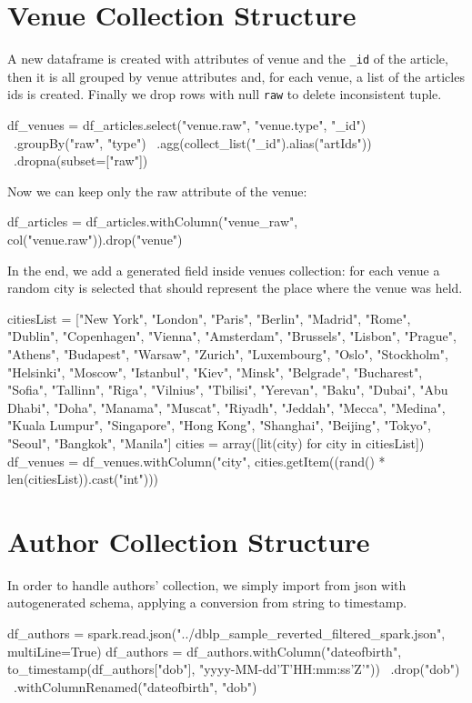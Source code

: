 \documentclass{Configuration_Files/PoliMi3i_thesis}
\begin{document}
\section{Venue Collection Structure}
A new dataframe is created with attributes of venue and the \verb |_id| of the article, then it is all grouped by
venue attributes and, for each venue, a list of the articles ids is created. Finally we drop rows with null \verb|raw|
to delete inconsistent tuple.
\begin{python}
df_venues = df_articles.select("venue.raw", "venue.type", "_id") \
                        .groupBy("raw", "type") \
                        .agg(collect_list("_id").alias("artIds")) \
                        .dropna(subset=["raw"])
\end{python}
\bigskip
Now we can keep only the raw attribute of the venue:
\begin{python}
df_articles = df_articles.withColumn("venue_raw", col("venue.raw")).drop("venue")
\end{python}
\bigskip
In the end, we add a generated field inside venues collection: for each venue a random city is selected that should
represent the place where the venue was held.
\begin{python}
citiesList = ["New York", "London", "Paris", "Berlin", "Madrid", "Rome", "Dublin", "Copenhagen", "Vienna", "Amsterdam", "Brussels", "Lisbon", "Prague", "Athens", "Budapest", "Warsaw", "Zurich", "Luxembourg", "Oslo", "Stockholm", "Helsinki", "Moscow", "Istanbul", "Kiev", "Minsk", "Belgrade", "Bucharest", "Sofia", "Tallinn", "Riga", "Vilnius", "Tbilisi", "Yerevan", "Baku", "Dubai", "Abu Dhabi", "Doha", "Manama", "Muscat", "Riyadh", "Jeddah", "Mecca", "Medina", "Kuala Lumpur", "Singapore", "Hong Kong", "Shanghai", "Beijing", "Tokyo", "Seoul", "Bangkok", "Manila"]
cities = array([lit(city) for city in citiesList])
df_venues = df_venues.withColumn("city", cities.getItem((rand() * len(citiesList)).cast("int")))
\end{python}

\section{Author Collection Structure}
In order to handle authors' collection, we simply import from json with autogenerated schema, applying a conversion from
string to timestamp.
\begin{python}
df_authors = spark.read.json("../dblp_sample_reverted_filtered_spark.json", multiLine=True)
df_authors = df_authors.withColumn("dateofbirth", to_timestamp(df_authors["dob"], "yyyy-MM-dd'T'HH:mm:ss'Z'")) \
                        .drop("dob") \
                        .withColumnRenamed("dateofbirth", "dob")
\end{python}
\end{document}
